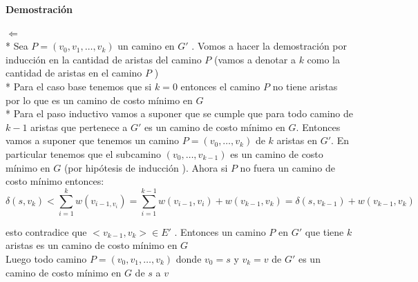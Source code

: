 \documentclass{article}
\begin{document}
    
    \vspace{0.3cm}
    \noindent \textbf{Demostraci\'on} 
    
    \noindent $ \Longleftarrow $
    \\*
    Sea $P = \left(v_0,v_1,\dots , v_k \right)$  un camino en $G'$ . 
    Vomos a hacer la demostraci\'on por inducci\'on en la cantidad de aristas del camino $P$ (vamos a denotar a $k$ como la cantidad de aristas en el camino $P$ )
    \\*
    Para el caso base tenemos que si $k=0$ entonces el camino $P$ no tiene aristas por lo que es un camino de costo m\'inimo en $G$ 
    \\*
    Para el paso inductivo vamos a suponer que se cumple que para todo camino de $k-1$ aristas que pertenece a  $G'$ es un camino de costo m\'inimo en $G$. 
    Entonces vamos a suponer que tenemos un camino $P = \left(v_{0},\dots,v_{k}\right)$  de $k$ aristas en $G'$. En particular tenemos que el subcamino $\left(v_0,\dots,v_{k-1}\right)$ es un camino de 
    costo m\'inimo en $G$ (por hip\'otesis de inducci\'on ). Ahora si $P$ no fuera un camino de costo m\'inimo entonces: 
    \begin{equation*}
        \delta \left(s,v_k\right) < \sum_{i=1}^{k} w\left(v_{i-1,v_i}\right) = \sum_{i=1}^{k-1} w\left(v_{i-1}, v_{i}\right) + w\left(v_{k-1}, v_{k}\right)  = \delta\left(s,v_{k-1}\right) + w\left(v_{k-1}, v_{k}\right)
    \end{equation*}

    \noindent esto contradice que $<v_{k-1}, v_{k}> \in E'$ . Entonces un camino $P$  en $G'$ que tiene $k$ aristas es un camino de costo m\'inimo en $G$ 
    \\
    Luego todo camino $P = \left(v_0,v_1,\dots , v_k \right)$ donde $v_{0}=s$ y $v_{k}=v$ de $G'$ es un camino  de costo m\'inimo en $G$ de $s$ a $v$ 
    
    \vspace*{0.5cm} 
\end{document}
